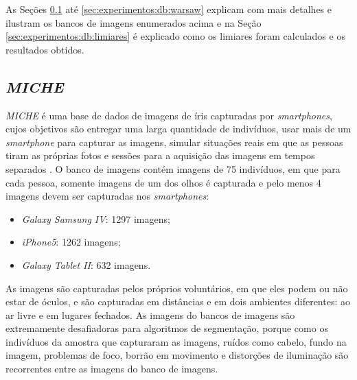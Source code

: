 
\par As Seções \ref{sec:experimentos:db:miche} até \ref{sec:experimentos:db:warsaw} explicam com mais detalhes e ilustram os bancos de imagens enumerados acima e na Seção \ref{sec:experimentos:db:limiares} é explicado como os limiares foram calculados e os resultados obtidos.

\subsection{\textit{MICHE}}\label{sec:experimentos:db:miche}

\par \textit{MICHE} é uma base de dados de imagens de íris capturadas por \textit{smartphones}, cujos objetivos são entregar uma larga quantidade de indivíduos, usar mais de um \textit{smartphone} para capturar as imagens, simular situações reais em que as pessoas tiram as próprias fotos e sessões para a aquisição das imagens em tempos separados \cite{santada2016-MICHE-2}. O banco de imagens contém imagens de 75 indivíduos, em que para cada pessoa, somente imagens de um dos olhos é capturada e pelo menos 4 imagens devem ser capturadas nos \textit{smartphones}:

\begin{itemize}
    \item \textit{Galaxy Samsung IV}: 1297 imagens;
    \item \textit{iPhone5}: 1262 imagens;
    \item \textit{Galaxy Tablet II}: 632 imagens.
\end{itemize}

\par As imagens são capturadas pelos próprios voluntários, em que eles podem ou não estar de óculos, e são capturadas em distâncias e em dois ambientes diferentes: ao ar livre e em lugares fechados. As imagens do bancos de imagens são extremamente desafiadoras para algoritmos de segmentação, porque como os indivíduos da amostra que capturaram as imagens, ruídos como cabelo, fundo na imagem, problemas de foco, borrão em movimento e distorções de iluminação são recorrentes entre as imagens do banco de imagens.

